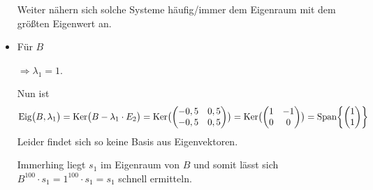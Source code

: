 \documentclass{scrreprt}
\begin{document}
\begin{itemize}
  Weiter nähern sich solche Systeme häufig/immer dem Eigenraum mit dem größten
  Eigenwert an.

\item Für $B$
  $\Rightarrow \lambda_1 = 1$.

  Nun ist
  \[
    \text{Eig}\qty\big(B, \lambda_1)
    = \text{Ker}\qty\big(B - \lambda_1 \cdot E_2)
    = \text{Ker}\qty\big(\begin{pmatrix}
      -0,5 & 0,5 \\
      -0,5 & 0,5 \\
    \end{pmatrix})
    = \text{Ker}\qty\big(\begin{pmatrix}
      1 & -1 \\
      0 & 0  \\
    \end{pmatrix})
    = \text{Span}\qty{\begin{pmatrix} 1 \\ 1 \end{pmatrix}}
  \]
  Leider findet sich so keine Basis aus Eigenvektoren.

  Immerhing liegt $s_1$ im Eigenraum von $B$ und somit lässt sich
  $B^{100} \cdot s_1 = 1^{100} \cdot s_1= s_1$ schnell ermitteln.
\end{itemize}
\end{document}
